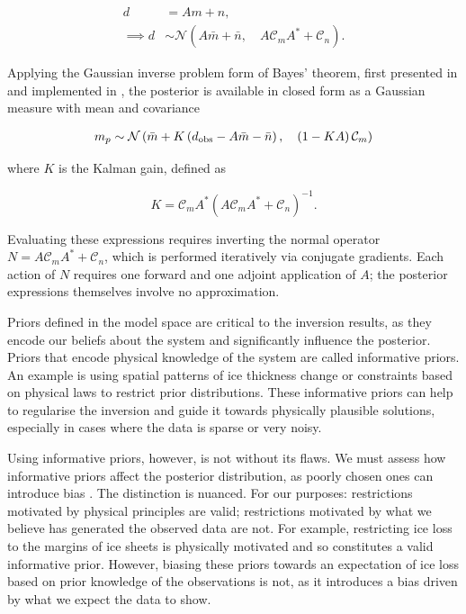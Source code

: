 \begin{align*}
	d &= Am +n,\\
	\implies  d &\sim \mathcal{N}\left(A\bar{m} + \bar{n},\quad A\mathcal{C}_mA^* + \mathcal{C}_n\right).
\end{align*}

Applying the Gaussian inverse problem form of Bayes' theorem, first presented in \textcite{stuartInverseProblemsBayesian2010} and implemented in \textcite{heathcoteScaleableBayesianFramework2026}, the posterior is available in closed form as a Gaussian measure with mean and covariance

\begin{align}
	m_p \sim \mathcal{N}\left(\bar{m}+K\left(d_{\text{obs}}-A\bar{m}-\bar{n}\right),\quad \left(1-KA\right)\mathcal{C}_{m}\right)
\end{align}

where $K$ is the Kalman gain, defined as

\begin{equation}
	K = \mathcal{C}_{m}A^*\left(A\mathcal{C}_{m}A^*+\mathcal{C}_{n}\right)^{-1}.
\end{equation}

Evaluating these expressions requires inverting the normal operator $N = A\mathcal{C}_{m}A^* + \mathcal{C}_{n}$, which is performed iteratively via conjugate gradients. Each action of $N$ requires one forward and one adjoint application of $A$; the posterior expressions themselves involve no approximation.

Priors defined in the model space are critical to the inversion results, as they encode our beliefs about the system and significantly influence the posterior. Priors that encode physical knowledge of the system are called informative priors. An example is using spatial patterns of ice thickness change or constraints based on physical laws to restrict prior distributions. These informative priors can help to regularise the inversion and guide it towards physically plausible solutions, especially in cases where the data is sparse or very noisy.

Using informative priors, however, is not without its flaws. We must assess how informative priors affect the posterior distribution, as poorly chosen ones can introduce bias \autocite{vandeschootBayesianStatisticsModelling2021}. The distinction is nuanced. For our purposes: restrictions motivated by physical principles are valid; restrictions motivated by what we believe has generated the observed data are not. For example, restricting ice loss to the margins of ice sheets is physically motivated and so constitutes a valid informative prior. However, biasing these priors towards an expectation of ice loss based on prior knowledge of the observations is not, as it introduces a bias driven by what we expect the data to show.
